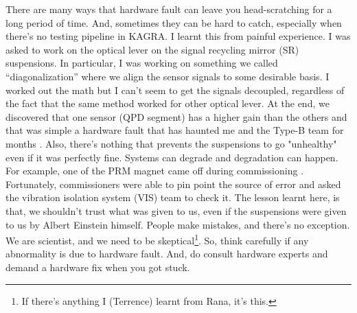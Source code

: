 There are many ways that hardware fault can leave you head-scratching for a long period of time.
And, sometimes they can be hard to catch, especially when there's no testing pipeline in KAGRA.
I learnt this from painful experience.
I was asked to work on the optical lever on the signal recycling mirror (SR) suspensions.
In particular, I was working on something we called ``diagonalization'' where we align the sensor signals to some desirable basis.
I worked out the math but I can't seem to get the signals decoupled, regardless of the fact that the same method worked for other optical lever.
At the end, we discovered that one sensor (QPD segment) has a higher gain than the others and that was simple a hardware fault that has haunted me and the Type-B team for months \cite{SR2_oplev_diagonalization, Comment_SR2_oplev}.
Also, there's nothing that prevents the suspensions to go "unhealthy" even if it was perfectly fine.
Systems can degrade and degradation can happen.
For example, one of the PRM magnet came off during commissioning \cite{PRM_magnet_came_off, MICH_got_locked}.
Fortunately, commissioners were able to pin point the source of error and asked the vibration isolation system (VIS) team to check it.
The lesson learnt here, is that, we shouldn't trust what was given to us, even if the suspensions were given to us by Albert Einstein himself.
People make mistakes, and there's no exception.
We are scientist, and we need to be skeptical\footnote{If there's anything I (Terrence) learnt from Rana, it's this.}.
So, think carefully if any abnormality is due to hardware fault.
And, do consult hardware experts and demand a hardware fix when you got stuck.

